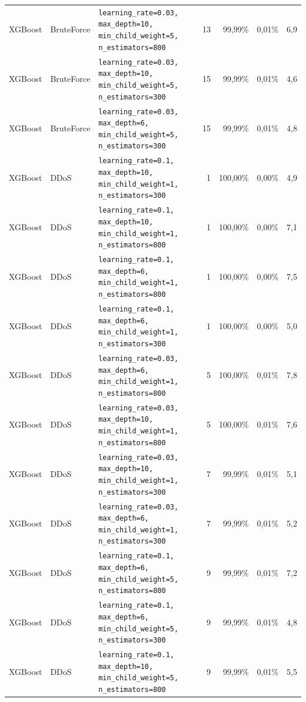 {{\begin{tabularx}{\textwidth}{@{}llLrrrr@{}}
XGBoost & BruteForce & \scriptsize\texttt{learning\_rate=0.03, max\_depth=10, min\_child\_weight=5, n\_estimators=800} & 13 & 99,99\% & 0,01\% & 6,9\\
XGBoost & BruteForce & \scriptsize\texttt{learning\_rate=0.03, max\_depth=10, min\_child\_weight=5, n\_estimators=300} & 15 & 99,99\% & 0,01\% & 4,6\\
XGBoost & BruteForce & \scriptsize\texttt{learning\_rate=0.03, max\_depth=6, min\_child\_weight=5, n\_estimators=300} & 15 & 99,99\% & 0,01\% & 4,8\\
XGBoost & DDoS & \scriptsize\texttt{learning\_rate=0.1, max\_depth=10, min\_child\_weight=1, n\_estimators=300} & 1 & 100,00\% & 0,00\% & 4,9\\
XGBoost & DDoS & \scriptsize\texttt{learning\_rate=0.1, max\_depth=10, min\_child\_weight=1, n\_estimators=800} & 1 & 100,00\% & 0,00\% & 7,1\\
XGBoost & DDoS & \scriptsize\texttt{learning\_rate=0.1, max\_depth=6, min\_child\_weight=1, n\_estimators=800} & 1 & 100,00\% & 0,00\% & 7,5\\
XGBoost & DDoS & \scriptsize\texttt{learning\_rate=0.1, max\_depth=6, min\_child\_weight=1, n\_estimators=300} & 1 & 100,00\% & 0,00\% & 5,0\\
XGBoost & DDoS & \scriptsize\texttt{learning\_rate=0.03, max\_depth=6, min\_child\_weight=1, n\_estimators=800} & 5 & 100,00\% & 0,01\% & 7,8\\
XGBoost & DDoS & \scriptsize\texttt{learning\_rate=0.03, max\_depth=10, min\_child\_weight=1, n\_estimators=800} & 5 & 100,00\% & 0,01\% & 7,6\\
XGBoost & DDoS & \scriptsize\texttt{learning\_rate=0.03, max\_depth=10, min\_child\_weight=1, n\_estimators=300} & 7 & 99,99\% & 0,01\% & 5,1\\
XGBoost & DDoS & \scriptsize\texttt{learning\_rate=0.03, max\_depth=6, min\_child\_weight=1, n\_estimators=300} & 7 & 99,99\% & 0,01\% & 5,2\\
XGBoost & DDoS & \scriptsize\texttt{learning\_rate=0.1, max\_depth=6, min\_child\_weight=5, n\_estimators=800} & 9 & 99,99\% & 0,01\% & 7,2\\
XGBoost & DDoS & \scriptsize\texttt{learning\_rate=0.1, max\_depth=6, min\_child\_weight=5, n\_estimators=300} & 9 & 99,99\% & 0,01\% & 4,8\\
XGBoost & DDoS & \scriptsize\texttt{learning\_rate=0.1, max\_depth=10, min\_child\_weight=5, n\_estimators=800} & 9 & 99,99\% & 0,01\% & 5,5\\

\end{tabularx}}}
